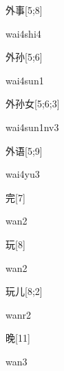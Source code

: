 \begin{verbete}{外事}[5;8]
\begin{pronuncia}{wai4shi4}
\end{pronuncia}
\end{verbete}

\begin{verbete}{外孙}[5;6]
\begin{pronuncia}{wai4sun1}
\end{pronuncia}
\end{verbete}

\begin{verbete}{外孙女}[5;6;3]
\begin{pronuncia}{wai4sun1nv3}
\end{pronuncia}
\end{verbete}

\begin{verbete}[wai4yu3]{外语}[5;9]
\begin{pronuncia}{wai4yu3}
\end{pronuncia}
\end{verbete}

\begin{verbete}[wan2]{完}[7]
\begin{pronuncia}{wan2}
\end{pronuncia}
\end{verbete}

\begin{verbete}[wan2]{玩}[8]
\begin{pronuncia}{wan2}
\end{pronuncia}
\end{verbete}

\begin{verbete}[wanr2]{玩儿}[8;2]
\begin{pronuncia}{wanr2}
\end{pronuncia}
\end{verbete}

\begin{verbete}[wan3]{晚}[11]
\begin{pronuncia}{wan3}
\end{pronuncia}
\end{verbete}

